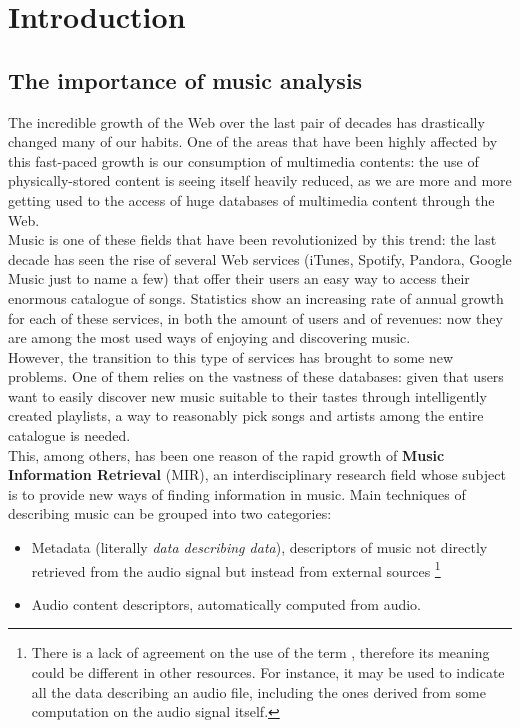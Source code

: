 
\chapter{Introduction} %

\label{Chapter1} %



\section{The importance of music analysis}
The incredible growth of the Web over the last pair of decades has drastically changed many of our habits. One of the areas that have been highly affected by this fast-paced growth is our consumption of multimedia contents: the use of physically-stored content is seeing itself heavily reduced, as we are more and more getting used to the access of huge databases of multimedia content through the Web.\\
Music is one of these fields that have been revolutionized by this trend: the last decade has seen the rise of several Web services (iTunes, Spotify, Pandora, Google Music just to name a few) that offer their users an easy way to access their enormous catalogue of songs. Statistics show an increasing rate of annual growth for each of these services, in both the amount of users and of revenues: now they are among the most used ways of enjoying and discovering music. \\
However, the transition to this type of services has brought to some new problems. One of them relies on the vastness of these databases: given that users want to easily discover new music suitable to their tastes through intelligently created playlists, a way to reasonably pick songs and artists among the entire catalogue is needed. \\
This, among others, has been one reason of the rapid growth of \textbf{Music Information Retrieval} (MIR), an interdisciplinary research field whose subject is to provide new ways of finding information in music. Main techniques of describing music can be grouped into two categories: 
\begin{itemize}
\item Metadata (literally \textit{data describing data}), descriptors of music not directly retrieved from the audio signal but instead from external sources \footnote{There is a lack of agreement on the use of the term , therefore its meaning could be different in other resources. For instance, it may be used to indicate all the data describing an audio file, including the ones derived from some computation on the audio signal itself.}
\item Audio content descriptors, automatically computed from audio.
\end{itemize}
